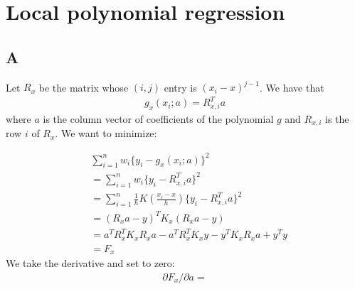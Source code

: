 \documentclass{article}
\begin{document}
\section*{Local polynomial regression}
\subsection*{A}
Let \(R_{x}\) be the matrix whose \( (i,j) \) entry is \( (x_i - x)^{j-1}\). We have that
\begin{align*}
g_x(x_i; a) = R_{x,i}^T a
\end{align*}
where \(a\) is the column vector of coefficients of the polynomial \(g\) and \(R_{x,i} \) is the row \(i\) of \(R_{x}\). We want to minimize:

\begin{align*}
&\sum_{i=1}^n w_i \{y_i - g_x(x_i; a)\}^2\\
&= \sum_{i=1}^n w_i \{y_i - R_{x,i}^T a\}^2\\
&= \sum_{i=1}^n \frac{1}{h}K\left(\frac{x_i - x}{h}\right)  \{y_i - R_{x,i}^T a\}^2\\
&= (R_x a - y)^T K_x (R_x a - y)\\
&= a^TR_x^T K_x R_x a  - a^TR_x^T K_x y -  y^T K_x R_x a + y^Ty\\
&= F_x
\end{align*}
We take the derivative and set to zero:
\begin{align*}
\partial F_x / \partial a = 
\end{align*}
\end{document}
